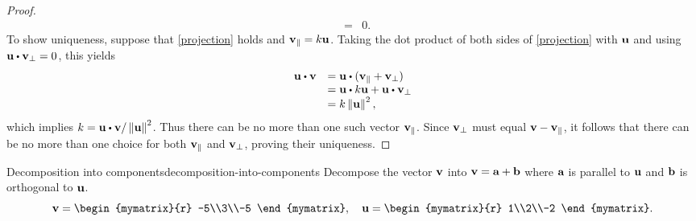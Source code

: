 \begin{proof}
\begin{eqnarray*}
    &=& 0.
  \end{eqnarray*}
  To show uniqueness, suppose that {\eqref{projection}} holds and
  $\vect{v}_{\coll}= k \vect{u}$.  Taking the dot product of both
  sides of {\eqref{projection}} with $\vect{u}$ and using
  $\vect{u}\dotprod\vect{v}_{\bot}=0$, this yields
  \begin{equation*}
    \begin{array}{ll}
      \vect{u}\dotprod \vect{v} & = \vect{u}\dotprod( \vect{v}_{\coll}+\vect{v}_{\bot }) \\
                                & =  \vect{u} \dotprod k\vect{u} + \vect{u}\dotprod\vect{v}_{\bot} \\
                                & = k \norm{\vect{u}}^{2},
    \end{array}
  \end{equation*}
  which implies
  $k =\vect{u}\dotprod \vect{v} / \norm{\vect{u}} ^{2}$.  Thus there
  can be no more than one such vector $\vect{v}_{\coll}$. Since
  $\vect{v}_{\bot}$ must equal $\vect{v}-\vect{v}_{\coll}$, it follows
  that there can be no more than one choice for both
  $\vect{v}_{\coll}$ and $\vect{v}_{\bot}$, proving their uniqueness.
\end{proof}

\begin{example}{Decomposition into components}{decomposition-into-components}
  Decompose the vector $\vect{v}$ into $\vect{v}=\vect{a}+\vect{b}$
  where $\vect{a}$ is parallel to $\vect{u}$ and $\vect{b}$ is
  orthogonal to $\vect{u}$.
  \begin{equation*}
    \vect{v} = \begin{mymatrix}{r} -5\\3\\-5 \end{mymatrix},\quad
    \vect{u} = \begin{mymatrix}{r} 1\\2\\-2 \end{mymatrix}.
  \end{equation*}
\end{example}

